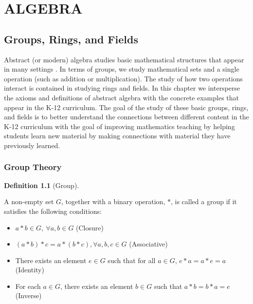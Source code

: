 \documentclass[
]{book}
\theoremstyle{definition}
\newtheorem{definition}{Definition}[chapter]
\theoremstyle{definition}
\theoremstyle{definition}
\theoremstyle{definition}
\theoremstyle{remark}
\begin{document}
\hypertarget{part-algebra}{%
\part{ALGEBRA}\label{part-algebra}}

\hypertarget{ch:group-1}{%
\chapter{Groups, Rings, and Fields}\label{ch:group-1}}

Abstract (or modern) algebra studies basic mathematical structures that appear in many settings . In terms of groups, we study mathematical sets and a single operation (such as addition or multiplication). The study of how two operations interact is contained in studying rings and fields. In this chapter we intersperse the axioms and definitions of abstract algebra with the concrete examples that appear in the K-12 curriculum. The goal of the study of these basic groups, rings, and fields is to better understand the connections between different content in the K-12 curriculum with the goal of improving mathematics teaching by helping students learn new material by making connections with material they have previously learned.

\hypertarget{sec:groups}{%
\section{Group Theory}\label{sec:groups}}

\begin{definition}[Group]
\protect\hypertarget{def:unlabeled-div-76}{}\label{def:unlabeled-div-76}

A non-empty set \(G\), together with a binary operation, \(*\), is called a group if it satisfies the following conditions:

\begin{itemize}
\item
  \(a*b \in G, \: \forall a,b \in G\) (Closure)
\item
  \((a*b)*c = a * (b*c), \forall a,b,c \in G\) (Associative)
\item
  There exists an element \(e \in G\) such that for all \(a\in G\), \(e*a=a*e=a\) (Identity)
\item
  For each \(a\in G\), there exists an element \(b\in G\) such that \(a*b=b*a=e\) (Inverse)
\end{itemize}

\end{definition}
\end{document}
